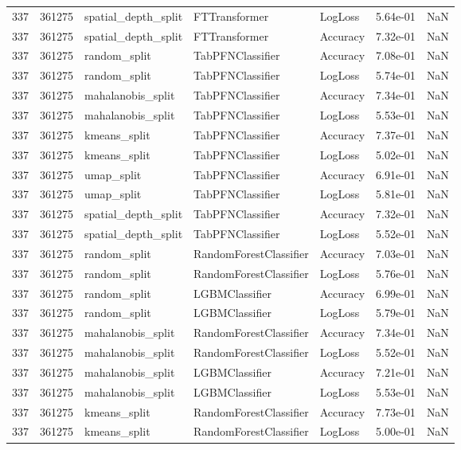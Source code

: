 \begin{tabular}{rrlllrr}
337 & 361275 & spatial\_depth\_split & FTTransformer & LogLoss & 5.64e-01 & NaN \\
337 & 361275 & spatial\_depth\_split & FTTransformer & Accuracy & 7.32e-01 & NaN \\
337 & 361275 & random\_split & TabPFNClassifier & Accuracy & 7.08e-01 & NaN \\
337 & 361275 & random\_split & TabPFNClassifier & LogLoss & 5.74e-01 & NaN \\
337 & 361275 & mahalanobis\_split & TabPFNClassifier & Accuracy & 7.34e-01 & NaN \\
337 & 361275 & mahalanobis\_split & TabPFNClassifier & LogLoss & 5.53e-01 & NaN \\
337 & 361275 & kmeans\_split & TabPFNClassifier & Accuracy & 7.37e-01 & NaN \\
337 & 361275 & kmeans\_split & TabPFNClassifier & LogLoss & 5.02e-01 & NaN \\
337 & 361275 & umap\_split & TabPFNClassifier & Accuracy & 6.91e-01 & NaN \\
337 & 361275 & umap\_split & TabPFNClassifier & LogLoss & 5.81e-01 & NaN \\
337 & 361275 & spatial\_depth\_split & TabPFNClassifier & Accuracy & 7.32e-01 & NaN \\
337 & 361275 & spatial\_depth\_split & TabPFNClassifier & LogLoss & 5.52e-01 & NaN \\
337 & 361275 & random\_split & RandomForestClassifier & Accuracy & 7.03e-01 & NaN \\
337 & 361275 & random\_split & RandomForestClassifier & LogLoss & 5.76e-01 & NaN \\
337 & 361275 & random\_split & LGBMClassifier & Accuracy & 6.99e-01 & NaN \\
337 & 361275 & random\_split & LGBMClassifier & LogLoss & 5.79e-01 & NaN \\
337 & 361275 & mahalanobis\_split & RandomForestClassifier & Accuracy & 7.34e-01 & NaN \\
337 & 361275 & mahalanobis\_split & RandomForestClassifier & LogLoss & 5.52e-01 & NaN \\
337 & 361275 & mahalanobis\_split & LGBMClassifier & Accuracy & 7.21e-01 & NaN \\
337 & 361275 & mahalanobis\_split & LGBMClassifier & LogLoss & 5.53e-01 & NaN \\
337 & 361275 & kmeans\_split & RandomForestClassifier & Accuracy & 7.73e-01 & NaN \\
337 & 361275 & kmeans\_split & RandomForestClassifier & LogLoss & 5.00e-01 & NaN \\

\end{tabular}
